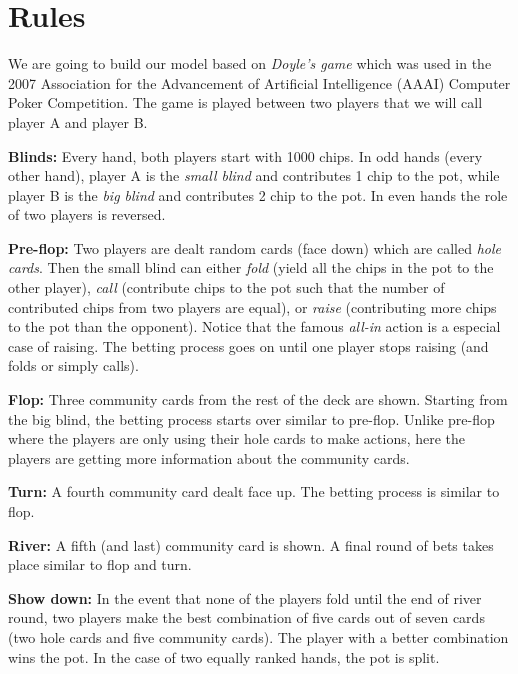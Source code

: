 
\section{Rules}
We are going to build our model based on \emph{Doyle's game} which was used 
in the 2007 Association for the Advancement of Artificial Intelligence (AAAI) 
Computer Poker Competition. The game is played between two players that we 
will call player A and player B. 

\BIT
\item \textbf{Blinds:} Every hand, both players start with 1000 chips. In odd hands (every other 
hand), player A is the \emph{small blind} and contributes 1 chip to the pot, while 
player B is the \emph{big blind} and contributes 2 chip to the pot. In even hands the 
role of two players is reversed. 
\item \textbf{Pre-flop:} Two players are dealt random cards (face down) which are called
\emph{hole cards}. Then the small blind can either \emph{fold} (\ie yield all the chips in
the pot to the other player), \emph{call} (contribute chips to the pot such that the number
of contributed chips from two players are equal), or \emph{raise} (contributing more chips
to the pot than the opponent). Notice that the famous \emph{all-in} action is a especial case
of raising. The betting process goes on until one player stops raising (and folds or simply calls).
\item \textbf{Flop:} Three community cards from the rest of the deck are shown. Starting from
the big blind, the betting process starts over similar to pre-flop. Unlike pre-flop where the
players are only using their hole cards to make actions, here the players are getting more
information about the community cards.
\item \textbf{Turn:} A fourth community card dealt face up. The betting process is similar to
flop.
\item \textbf{River:} A fifth (and last) community card is shown. A final round of bets takes place
similar to flop and turn.
\item \textbf{Show down:} In the event that none of the players fold until the end of river round,
two players make the best combination of five cards out of seven cards (two hole cards and 
five community cards). The player with a better combination wins the pot. In the case of
two equally ranked hands, the pot is split.
\EIT
